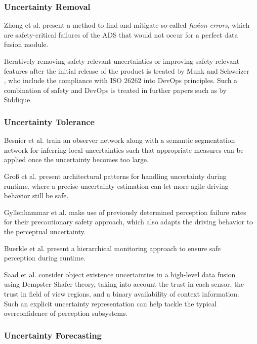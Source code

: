 \documentclass[conference]{IEEEtran}
\begin{document}
\subsubsection{Uncertainty Removal}
\label{sec:uncertainty_removal}

Zhong et al. \cite{Zhong2021detecting} present a method to find and mitigate so-called \textit{fusion errors}, which are safety-critical failures of the ADS that would not occur for a perfect data fusion module.

Iteratively removing safety-relevant uncertainties or improving safety-relevant features after the initial release of the product is treated by Munk and Schweizer \cite{Munk2022safeops}, who include the compliance with ISO 26262 into DevOps principles.
Such a combination of safety and DevOps is treated in further papers such as \cite{Siddique2020} by Siddique.


\subsubsection{Uncertainty Tolerance}
\label{sec:uncertainty_tolerance}

Besnier et al. \cite{Besnier2021uncertainty} train an observer network along with a semantic segmentation network for inferring local uncertainties such that appropriate measures can be applied once the uncertainty becomes too large.

Groß et al. \cite{Gross2022architectural} present architectural patterns for handling uncertainty during runtime, where a precise uncertainty estimation can let more agile driving behavior still be safe.

Gyllenhammar et al. \cite{Gyllenhammar2022uncertainty} make use of previously determined perception failure rates for their precautionary safety approach, which also adapts the driving behavior to the perceptual uncertainty. 

Buerkle et al. \cite{Buerkle2022safe} present a hierarchical monitoring approach to ensure safe perception during runtime.

Saad et al. \cite{Saad2022uncertainty} consider object existence uncertainties in a high-level data fusion using Dempster-Shafer theory, taking into account the trust in each sensor, the trust in field of view regions, and a binary availability of context information. Such an explicit uncertainty representation can help tackle the typical overconfidence of perception subsystems. 

\subsubsection{Uncertainty Forecasting}
\label{sec:uncertainty_forecasting}
\end{document}
